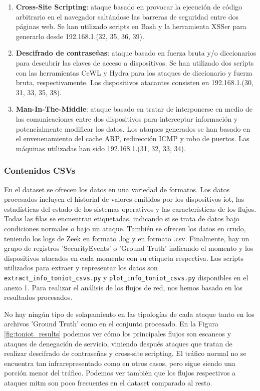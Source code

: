 \begin{enumerate}
  \item \textbf{Cross-Site Scripting}: ataque basado en provocar la ejecución de código arbitrario en el navegador saltándose las barreras de seguridad entre dos páginas web. Se han utilizado scripts en Bash y la herramienta XSSer para generarlo desde 192.168.1.(32, 35, 36, 39).
  \item \textbf{Descifrado de contraseñas}: ataque basado en fuerza bruta y/o diccionarios para descubrir las claves de acceso a dispositivos. Se han utilizado dos scripts con las herramientas CeWL y Hydra para los ataques de diccionario y fuerza bruta, respectivamente. Los dispositivos atacantes consisten en 192.168.1.(30, 31, 33, 35, 38).
  \item \textbf{Man-In-The-Middle}: ataque basado en tratar de interponerse en medio de las comunicaciones entre dos dispositivos para interceptar información y potencialmente modificar los datos. Los ataques generados se han basado en el envenenamiento del cache ARP, redirección ICMP y robo de puertos. Las máquinas utilizadas han sido 192.168.1.(31, 32, 33, 34).
\end{enumerate}

\subsubsection{Contenidos CSVs}

En el dataset se ofrecen los datos en una variedad de formatos. Los datos procesados incluyen el historial de valores emitidos por los dispositivos \acrshort{iot}, las estadísticas del estado de los sistemas operativos y las características de los flujos. Todas las filas se encuentran etiquetadas, indicando si se trata de datos bajo condiciones normales o bajo un ataque. También se ofrecen los datos en crudo, teniendo los logs de Zeek en formato .log y en formato .csv. Finalmente, hay un grupo de registros 'SecurityEvents' o 'Ground Truth' indicando el momento y los dispositivos atacados en cada momento con su etiqueta respectiva. Los scripts utilizados para extraer y representar los datos son \texttt{extract\_info\_toniot\_csvs.py} y \texttt{plot\_info\_toniot\_csvs.py} disponibles en el anexo 1. Para realizar el análisis de los flujos de red, nos hemos basado en los resultados procesados.

No hay ningún tipo de solapamiento en las tipologías de cada ataque tanto en los archivos 'Ground Truth' como en el conjunto procesado. En la Figura \ref{fig:toniot_results} podemos ver cómo los principales flujos son escaneos y ataques de denegación de servicio, viniendo después ataques que tratan de realizar descifrado de contraseñas y cross-site scripting. El tráfico normal no se encuentra tan infrarepresentado como en otros casos, pero sigue siendo una porción menor del tráfico. Podemos ver también que los flujos respectivos a ataques \acrshort{mitm} son poco frecuentes en el dataset comparado al resto.

